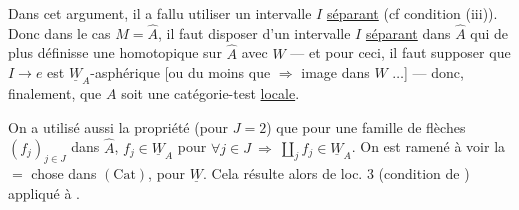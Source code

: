 
Dans cet argument, il a fallu  utiliser un intervalle
$I$ \uline{séparant} (cf condition (iii)). Donc dans le cas $M=\widehat A$, il faut
disposer d'un intervalle $I$ \uline{séparant} dans $\widehat A$
 qui de plus définisse une 
homotopique sur $\widehat A$  avec $W$
--- et pour ceci, il faut supposer que
$I\longrightarrow e$ est $\underline W_A$-asphérique
[ou du moins que 
 
$\Rightarrow$ image dans $W$ $\ldots$] --- donc, finalement, que
 \margin{$\Vert$} $A$ soit une catégorie-test \uline{locale}.

On a utilisé aussi la propriété (pour  $J=2$) que pour une famille de
flèches $(f_j)_{j\in J}$ dans $\widehat A$, $f_j\in\underline W_A$ pour
$\forall j\in J\ \Longrightarrow\ \coprod_j f_j\in\underline W_A$.
On est ramené à voir la $=$ chose dans $(\mathrm{Cat})$, pour $\underline W$.
Cela résulte alors de loc. 3 (condition de ) appliqué à
.

